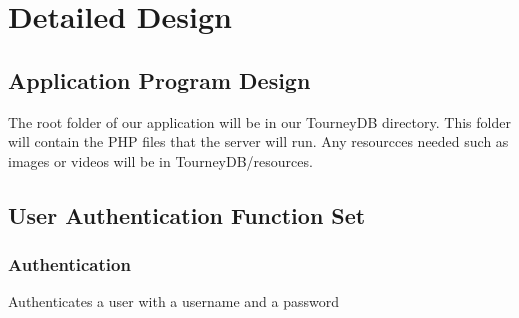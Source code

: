 \documentclass{article}
\begin{document}
\section{Detailed Design}

\subsection{Application Program Design}
The root folder of our application will be in our TourneyDB directory. This folder will contain the PHP files that the server will run. Any resourcces needed such as images or videos will be in TourneyDB/resources.

\subsection{User Authentication Function Set}

\subsubsection{Authentication}
Authenticates a user with a username and a password
\end{document}
